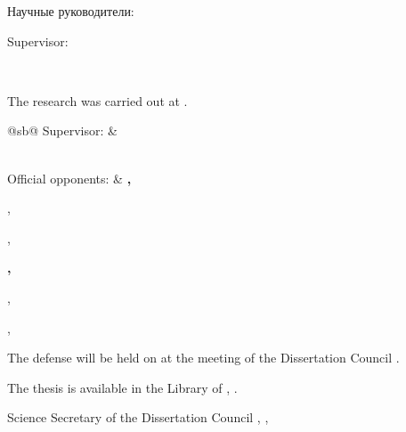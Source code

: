 %
\vspace{0pt plus4fill} %
\begin{flushright}
	\ifdefined\supervisorTwoFio
	Научные руководители:
	
	\supervisorRegaliaEn
	
	\ifdefined\supervisorDead
	\framebox{\supervisorFio}
	\else
	\supervisorFio
	\fi
	
	\supervisorTwoRegalia
	
	\ifdefined\supervisorTwoDead
	\framebox{\supervisorTwoFio}
	\else
	\supervisorTwoFio
	\fi
	\else
	Supervisor:
	
	\supervisorRegaliaEn
	
	\ifdefined\supervisorDead
	\framebox{\supervisorFioEn}
	\else
	\supervisorFioEn
	\fi
	\fi
	
\end{flushright}
%
\vspace{0pt plus4fill} %
{\centering\thesisCityEn\ \thesisYear\par}

\clearpage

\thispagestyle{empty}
\noindent The research was carried out at {\thesisOrganizationEn}.

\vspace{0.008\paperheight plus1fill}
\noindent%
\begin{tabularx}{\textwidth}{@{}sb@{}}
	Supervisor:   & \supervisorRegaliaEn\par
	\textbf{\supervisorFioEn}
	\vspace{0.013\paperheight}\\
	
	Official opponents:  &
	\textbf{\opponentOneFioEn,}\par
	\opponentOneRegaliaEn,\par
	\opponentOneJobPlaceEn,\par
	\opponentOneJobPostEn\par
	\vspace{0.01\paperheight}
	\textbf{\opponentTwoFioEn,}\par
	\opponentTwoRegaliaEn,\par
	\opponentTwoJobPlaceEn,\par
	\opponentTwoJobPostEn
\end{tabularx}

\vspace{0.008\paperheight plus1fill}
\noindent The defense will be held on {} at the meeting of the {\thesisOrganizationEn} Dissertation Council {}.

\vspace{0.008\paperheight plus1fill}
\noindent The thesis is available in the Library of \thesisOrganizationEn, \synopsisLibraryEn.

\vspace{0.008\paperheight plus1fill}
\noindent Science Secretary of the {\thesisOrganizationEn} Dissertation Council , , 
